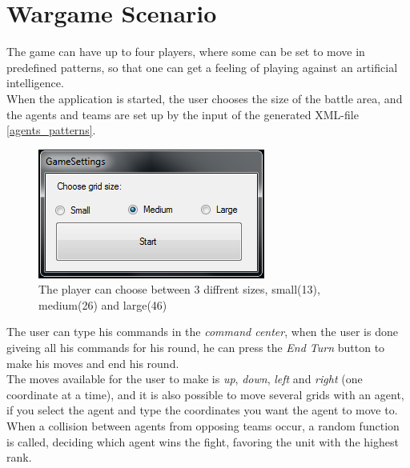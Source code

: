\section{Wargame Scenario}
\label{sec:wargame}

The game can have up to four players, where some can be set to move in predefined patterns, so that one can get a feeling of playing against an artificial intelligence.\\ \indent
	When the application is started, the user chooses the size of the battle area, and the agents and teams are set up by the input of the generated XML-file \ref{agents_patterns}.

\begin{figure}[H]
\begin{center}
\includegraphics{Images/settings.png}
\end{center}
\caption{The player can choose between 3 diffrent sizes, small(13), medium(26) and large(46)}
\label{fig:settings}
\end{figure}

The user can type his commands in the \textit{command center}, when the user is done giveing all his commands for his round, he can press the \textit{End Turn} button to make his moves and end his round.\\ \indent
	The moves available for the user to make is \textit{up}, \textit{down}, \textit{left} and \textit{right} (one coordinate at a time), and it is also possible to move several grids with an agent, if you select the agent and type the coordinates you want the agent to move to.\\ \indent
  When a collision between agents from opposing teams occur, a random function is called, deciding which agent wins the fight, favoring the unit with the highest rank.
	
